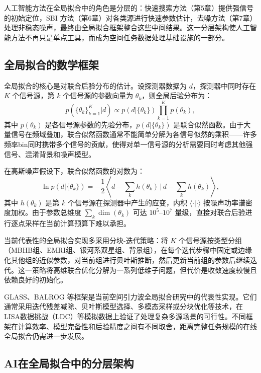 人工智能方法在全局拟合中的角色是分层的：快速搜索方法（第5章）提供强信号的初始定位，SBI 方法（第6章）对各类源进行快速参数估计，去噪方法（第7章）处理非稳态噪声，最终由全局拟合框架整合这些中间结果。这一分层架构使人工智能方法不再只是单点工具，而成为空间任务数据处理基础设施的一部分。

\subsection{全局拟合的数学框架}

全局拟合的核心是对联合后验分布的估计。设探测器数据为 $d$，探测器中同时存在 $K$ 个信号源，第 $k$ 个信号源的参数向量为 $\theta_k$，则全局后验分布为：
\begin{equation}
p(\{\theta_k\}_{k=1}^K | d) \propto p(d|\{\theta_k\}) \prod_{k=1}^K p(\theta_k),
\end{equation}
其中 $p(\theta_k)$ 是各信号源参数的先验分布，$p(d|\{\theta_k\})$ 是联合似然函数。由于大量信号在频域叠加，联合似然函数通常不能简单分解为各信号似然的乘积——许多频率bin同时携带多个信号的贡献，使得对单一信号源的分析需要同时考虑其他强信号、混淆背景和噪声模型。

在高斯噪声假设下，联合似然函数的对数为：
\begin{equation}
\ln p(d|\{\theta_k\}) = -\frac{1}{2} \left\langle d - \sum_k h(\theta_k) \,\bigg|\, d - \sum_k h(\theta_k) \right\rangle,
\end{equation}
其中 $h(\theta_k)$ 是第 $k$ 个信号源在探测器中产生的应变，内积 $\langle \cdot | \cdot \rangle$ 按噪声功率谱密度加权。由于参数总维度 $\sum_k \dim(\theta_k)$ 可达 $10^5$--$10^7$ 量级，直接对联合后验进行逐点采样在当前计算预算下难以承担。

当前代表性的全局拟合实现多采用分块-迭代策略：将 $K$ 个信号源按类型分组（MBHB组、EMRI组、银河系双星组、背景组），在每个迭代步骤中固定或边缘化其他组的近似参数，对当前组进行贝叶斯推断，然后更新当前组的参数后继续迭代。这一策略将高维联合优化分解为一系列低维子问题，但代价是收敛速度较慢且依赖良好的初始化。

GLASS、BALROG 等框架是当前空间引力波全局拟合研究中的代表性实现。它们通常采用迭代残差减除、贝叶斯模型选择、多模态采样或分块优化等技术，在LISA数据挑战（LDC）等模拟数据上验证了处理复杂多源场景的可行性。不同框架在计算效率、模型完备性和后验精度之间有不同取舍，距离完整任务规模的在线全局拟合仍需进一步发展。

\subsection{AI在全局拟合中的分层架构}

